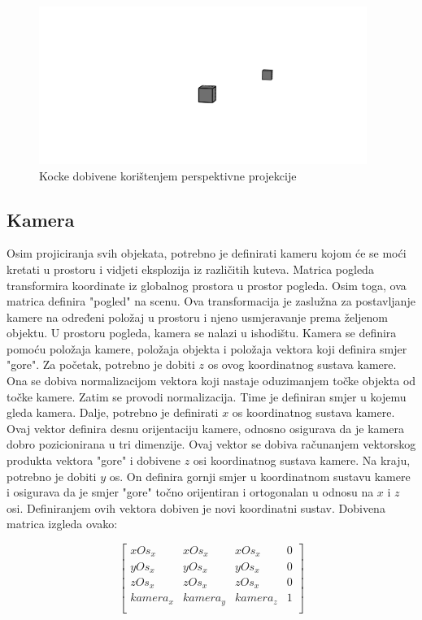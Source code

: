 \documentclass{foi}
\begin{document}
\begin{figure}[H]
	\centering
	\includegraphics[width=0.95\textwidth]{slike/37_PerspektivnaProjekcijaKuba.png}
	\captionsetup{justification=centering}
	\caption{Kocke dobivene korištenjem perspektivne projekcije}
	\label{fig:PerspektivnaProjekcijaKuba}
\end{figure}

\subsection{Kamera}
Osim projiciranja svih objekata, potrebno je definirati kameru kojom će se moći kretati u prostoru i vidjeti eksplozija iz različitih kuteva. Matrica pogleda transformira koordinate iz globalnog prostora u prostor pogleda. Osim toga, ova matrica definira "pogled" na scenu. Ova transformacija je zaslužna za postavljanje kamere na određeni položaj u prostoru i njeno usmjeravanje prema željenom objektu. U prostoru pogleda, kamera se nalazi u ishodištu. Kamera se definira pomoću položaja kamere, položaja objekta i položaja vektora koji definira smjer "gore". Za početak, potrebno je dobiti $z$ os ovog koordinatnog sustava kamere. Ona se dobiva normalizacijom vektora koji nastaje oduzimanjem točke objekta od točke kamere. Zatim se provodi normalizacija. Time je definiran smjer u kojemu gleda kamera. Dalje, potrebno je definirati $x$ os koordinatnog sustava kamere. Ovaj vektor definira desnu orijentaciju kamere, odnosno osigurava da je kamera dobro pozicionirana u tri dimenzije. Ovaj vektor se dobiva računanjem vektorskog produkta vektora "gore" i dobivene $z$ osi koordinatnog sustava kamere. Na kraju, potrebno je dobiti $y$ os. On definira gornji smjer u koordinatnom sustavu kamere i osigurava da je smjer "gore" točno orijentiran i ortogonalan u odnosu na $x$ i $z$ osi. Definiranjem ovih vektora dobiven je novi koordinatni sustav. Dobivena matrica izgleda ovako:

\[
\begin{bmatrix}
	xOs_x & xOs_x & xOs_x & 0 \\
	yOs_x & yOs_x & yOs_x & 0 \\
	zOs_x & zOs_x & zOs_x & 0 \\
	kamera_x & kamera_y & kamera_z & 1 \\
\end{bmatrix}
\]
\end{document}
